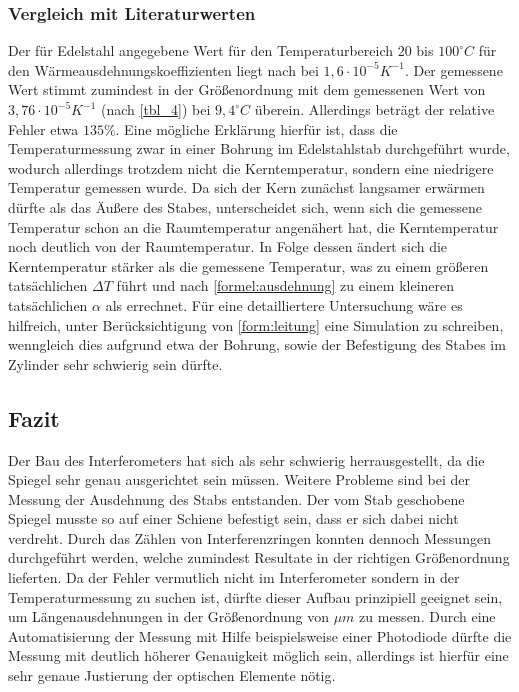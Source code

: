 \subsubsection{Vergleich mit Literaturwerten}
Der für Edelstahl angegebene Wert für den Temperaturbereich $ 20 $ bis $ 100 ^{\circ} C $ für den Wärmeausdehnungskoeffizienten liegt nach \cite{edelstahl} bei $ 1,6 \cdot 10^{-5} K^{-1} $. Der gemessene Wert stimmt zumindest in der Größenordnung mit dem gemessenen Wert von $ 3,76 \cdot 10^{-5} K^{-1} $ (nach \ref{tbl_4}) bei $ 9,4 ^{\circ} C $ überein. Allerdings beträgt der relative Fehler etwa $ 135 \% $. Eine mögliche Erklärung hierfür ist, dass die Temperaturmessung zwar in einer Bohrung im Edelstahlstab durchgeführt wurde, wodurch allerdings trotzdem nicht die Kerntemperatur, sondern eine niedrigere Temperatur gemessen wurde. Da sich der Kern zunächst langsamer erwärmen dürfte als das Äußere des Stabes, unterscheidet sich, wenn sich die gemessene Temperatur schon an die Raumtemperatur angenähert hat, die Kerntemperatur noch deutlich von der Raumtemperatur. In Folge dessen ändert sich die Kerntemperatur stärker als die gemessene Temperatur, was zu einem größeren tatsächlichen $ \Delta T$ führt und nach \eqref{formel:ausdehnung} zu einem kleineren tatsächlichen $ \alpha $ als errechnet. Für eine detailliertere Untersuchung wäre es hilfreich, unter Berücksichtigung von \eqref{form:leitung} eine Simulation zu schreiben, wenngleich dies aufgrund etwa der Bohrung, sowie der Befestigung des Stabes im Zylinder sehr schwierig sein dürfte. 


\subsection{Fazit}


Der Bau des Interferometers hat sich als sehr schwierig herrausgestellt, da die Spiegel sehr genau ausgerichtet sein müssen.
Weitere Probleme sind bei der Messung der Ausdehnung des Stabs entstanden. Der vom Stab geschobene Spiegel musste so auf einer Schiene befestigt sein, dass er sich dabei nicht verdreht.
Durch das Zählen von Interferenzringen konnten dennoch Messungen durchgeführt werden, welche zumindest Resultate in der richtigen Größenordnung lieferten. Da der Fehler vermutlich nicht im Interferometer sondern in der Temperaturmessung zu suchen ist, dürfte dieser Aufbau prinzipiell geeignet sein, um Längenausdehnungen in der Größenordnung von $ \mu m $ zu messen. Durch eine Automatisierung der Messung mit Hilfe beispielsweise einer Photodiode dürfte die Messung mit deutlich höherer Genauigkeit möglich sein, allerdings ist hierfür eine sehr genaue Justierung der optischen Elemente nötig.


